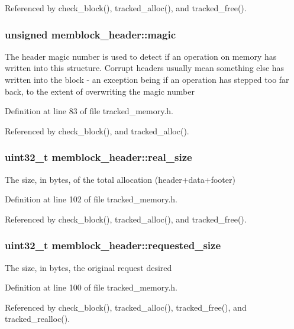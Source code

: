 Referenced by check\-\_\-block(), tracked\-\_\-alloc(), and tracked\-\_\-free().

\subsubsection[{magic}]{\setlength{\rightskip}{0pt plus 5cm}unsigned memblock\-\_\-header\-::magic}\label{structmemblock__header_a10ebc950edccb690a784aceb6362d696}
The header magic number is used to detect if an operation on memory has written into this structure. Corrupt headers usually mean something else has written into the block -\/ an exception being if an operation has stepped too far back, to the extent of overwriting the magic number 

Definition at line 83 of file tracked\-\_\-memory.\-h.



Referenced by check\-\_\-block(), and tracked\-\_\-alloc().

\subsubsection[{real\-\_\-size}]{\setlength{\rightskip}{0pt plus 5cm}uint32\-\_\-t memblock\-\_\-header\-::real\-\_\-size}\label{structmemblock__header_acbea4f5572643309ac41e9493baaa7f7}
The size, in bytes, of the total allocation (header+data+footer) 

Definition at line 102 of file tracked\-\_\-memory.\-h.



Referenced by check\-\_\-block(), tracked\-\_\-alloc(), and tracked\-\_\-free().

\subsubsection[{requested\-\_\-size}]{\setlength{\rightskip}{0pt plus 5cm}uint32\-\_\-t memblock\-\_\-header\-::requested\-\_\-size}\label{structmemblock__header_a9f32a9108b8ca49a6296605b42ee3a54}
The size, in bytes, the original request desired 

Definition at line 100 of file tracked\-\_\-memory.\-h.



Referenced by check\-\_\-block(), tracked\-\_\-alloc(), tracked\-\_\-free(), and tracked\-\_\-realloc().

